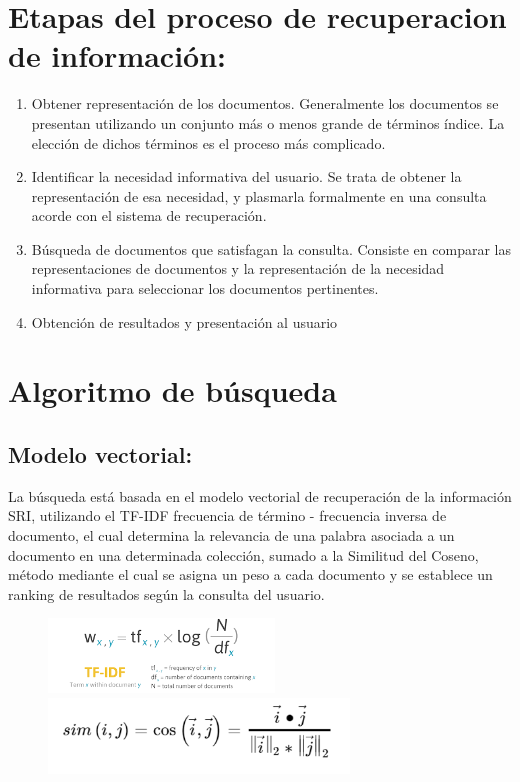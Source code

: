 \documentclass{article}%
\begin{document}
\section*{Etapas del proceso de recuperacion de información:}
\begin{enumerate}
    \item Obtener representación de los documentos. Generalmente los documentos se presentan utilizando un conjunto más o menos grande de términos índice. La elección de dichos términos es el proceso más complicado.
    \item Identificar la necesidad informativa del usuario. Se trata de obtener la representación de esa necesidad, y plasmarla formalmente en una consulta acorde con el sistema de recuperación.
    \item Búsqueda de documentos que satisfagan la consulta. Consiste en comparar las representaciones de documentos y la representación de la necesidad informativa para seleccionar los documentos pertinentes.
    \item Obtención de resultados y presentación al usuario
\end{enumerate}


\section*{Algoritmo de búsqueda}

    \subsection*{Modelo vectorial:}
    La búsqueda está basada en el modelo vectorial de recuperación de la información SRI, utilizando el TF-IDF frecuencia de término - frecuencia inversa de documento, el cual determina la relevancia de una palabra asociada a un documento en una determinada colección, sumado a la Similitud del Coseno, método mediante el cual se asigna un peso a cada documento y se establece un ranking de resultados según la consulta del usuario.
\begin{figure}[h]
    \includegraphics*[width=6cm]{descarga.png}
    \includegraphics*[width=8cm]{descarga (2).png}
\end{figure}
\end{document}
